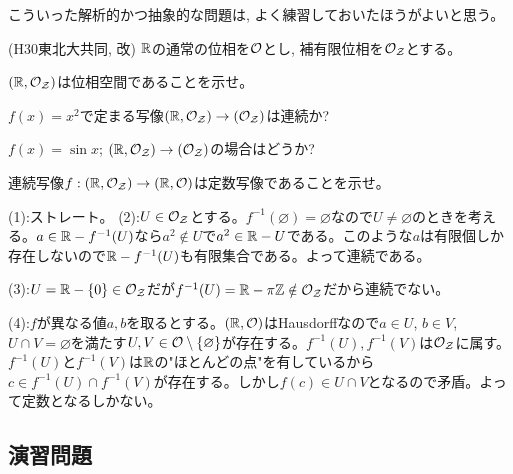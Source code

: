 こういった解析的かつ抽象的な問題は, よく練習しておいたほうがよいと思う。
\begin{egprob} (H30東北大共同, 改)
$\mathbb{R}$の通常の位相を$\mathcal{O}$とし, 補有限位相を$\mathcal{O}_{\mathcal{Z}}$とする。
\ben
\item $(\mathbb{R},\mathcal{O}_{\mathcal{Z}})$は位相空間であることを示せ。
\item $f(x) = x^2$で定まる写像$(\mathbb{R},\mathcal{O}_{\mathcal{Z}})\to (\mathcal{O}_{\mathcal{Z}})$は連続か?
\item $f(x) = \sin{x}$; $(\mathbb{R},\mathcal{O}_{\mathcal{Z}})\to (\mathcal{O}_{\mathcal{Z}})$の場合はどうか?
\item 連続写像$f:(\mathbb{R},\mathcal{O}_{\mathcal{Z}})\to (\mathbb{R},\mathcal{O})$は定数写像であることを示せ。
\een
\end{egprob}
\begin{egans}
(1):ストレート。
(2):$U\in \mathcal{O}_{\mathcal{Z}}$とする。$f^{-1}(\varnothing) = \varnothing$なので$U\neq \varnothing$のときを考える。$a\in \mathbb{R} - f^{-1}(U)$なら$a^2\notin U$で$a^2 \in \mathbb{R}- U$である。このような$a$は有限個しか存在しないので$\mathbb{R}-f^{-1}(U)$も有限集合である。よって連続である。

(3):$U = \mathbb{R} - \{ 0 \}\in \mathcal{O}_{\mathcal{Z}}$だが$f^{-1}(U) = \mathbb{R} - \pi\mathbb{Z} \notin \mathcal{O}_{\mathcal{Z}}$だから連続でない。

(4):$f$が異なる値$a,b$を取るとする。$(\mathbb{R}, \mathcal{O})$はHausdorffなので$a\in U$, $b\in V$, $U\cap V = \varnothing$を満たす$U,V\in \mathcal{O}\setminus{\{ \varnothing\}}$が存在する。$f^{-1}(U), f^{-1}(V)$は$\mathcal{O}_{\mathcal{Z}}$に属す。$f^{-1}(U)$と$f^{-1}(V)$は$\mathbb{R}$の"ほとんどの点"を有しているから$c\in f^{-1}(U)\cap f^{-1}(V)$が存在する。しかし$f(c) \in U\cap V$となるので矛盾。よって定数となるしかない。
\end{egans}

\begin{egprob}

\end{egprob}

\subsection{演習問題}






\newpage
